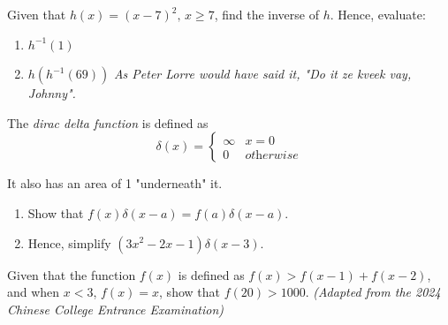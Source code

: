 \begin{problem}

  Given that \(h(x)=(x-7)^2, \, x \geq 7\), find the inverse of \(h\).
  Hence, evaluate:
  \begin{enumerate}[label=\alph*)]
    \item{\(h^{-1}(1)\)}
    \item{\(h(h^{-1}(69))\) \textit{As Peter Lorre would have said it, "Do it ze kveek vay, Johnny".}}
  \end{enumerate}
\end{problem}


\begin{problem}[1]
  The \emph{dirac delta function} is defined as 
  \begin{equation}
    \delta(x)=\begin{cases}
      \infty & x=0 \\
      0 & \textit{otherwise}
    \end{cases}
  \end{equation}


  It also has an area of 1 "underneath" it.

  \begin{enumerate}[label=\alph*)]
    \item{Show that \(f(x)\delta(x-a)=f(a)\delta(x-a)\).}
    \item{Hence, simplify \((3x^2-2x-1)\delta(x-3)\).}
  \end{enumerate}
  \label{diracpb}
\end{problem}
\begin{problem}[1]
  Given that the function \(f(x)\) is defined as \(f(x)>f(x-1)+f(x-2)\), and when \(x<3\), \(f(x)=x\), show that \(f(20)>1000\). \textit{(Adapted from the 2024 Chinese College Entrance Examination)} 
\end{problem} 
%
